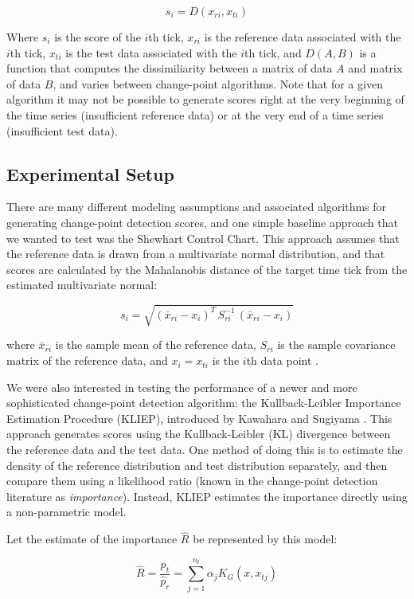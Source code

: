 \[
s_i = D(x_{ri}, x_{ti})
\]

Where $s_i$ is the score of the $i$th tick, $x_{ri}$ is the reference
data associated with the $i$th tick, $x_{ti}$ is the test data
associated with the $i$th tick, and $D(A,B)$ is a function that computes the
dissimiliarity between a matrix of data $A$ and matrix of data $B$, and varies
between change-point algorithms. Note that for a given
algorithm it may not be possible to generate scores right at the very beginning
of the time series (insufficient reference data) or at the very end of a time
series (insufficient test data).

\subsection{Experimental Setup}

There are many different modeling assumptions and associated algorithms
for generating change-point detection scores, and one simple baseline approach that we 
wanted to test was the Shewhart Control Chart. This approach assumes that the reference data is drawn from a
multivariate normal distribution, and that scores are calculated by the Mahalanobis
distance of the target time tick from the estimated multivariate normal:

\[
s_i = \sqrt{(\bar{x}_{ri} - x_i)^T \, S_{ri}^{-1} \, (\bar{x}_{ri} - x_i)}
\]

where $\bar{x}_{ri}$ is the sample mean of the reference data, $S_{ri}$
is the sample covariance matrix of the reference data, and $x_i=x_{ti}$ is
the $i$th data point \cite{shewhart26}.

We were also interested in testing the performance of a newer and more
sophisticated change-point detection algorithm: the
Kullback-Leibler Importance Estimation Procedure (KLIEP),
introduced by Kawahara and Sugiyama \cite{sugiyama09} \cite{sugiyama08}.
This approach generates scores using the Kullback-Leibler (KL)
divergence between the reference data and the test data. One method of doing this
is to estimate the density of the reference distribution and test distribution
separately, and then compare them using a likelihood ratio
(known in the change-point detection literature as \emph{importance}). 
Instead, KLIEP estimates the importance directly using a non-parametric model.

Let the estimate of the importance $\hat{R}$ be represented by this model:

\[
\hat{R} = \frac{p_{t}}{\hat{p}_{r}} = \sum_{j=1}^{n_{t}} \alpha_j K_G(x,x_{tj})
\]

